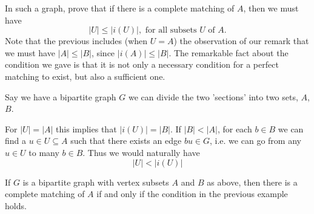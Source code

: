 \documentclass[10pt, a4paper]{article}
\begin{document}
\begin{example}
    In such a graph,
    prove that if there is a complete matching of $A$,
    then we must have
    \[
    |U| \leq |i(U)|,\text{ for all subsets $U$ of $A$}.
    \]
    Note that the previous includes
    (when $U = A$)
    the observation of our remark that we must have $|A| \leq |B|$,
    since $|i(A)| \leq |B|$.
    The remarkable fact about the condition we gave is that it is not only a necessary condition for a perfect matching to exist,
    but also a sufficient one.

    \begin{solution}
        Say we have a bipartite graph $G$ we can divide the two 'sections' into two sets,
        $A$,
        $B$.

        For $|U| = |A|$ this implies that $|i(U)| = |B|$.
        If $|B| < |A|$,
        for each $b \in B$ we can find a $u \in U \subseteq A$ such that there exists an edge $bu \in G$,
        i.e.
        we can go from any $u \in U$ to many $b \in B$.
        Thus we would naturally have
        \[
        |U| < |i(U)|
        \]
    \end{solution}
\end{example}

\begin{theorem}
    If $G$ is a bipartite graph with vertex subsets $A$ and $B$ as above,
    then there is a complete matching of $A$ if and only if the condition in the previous example holds.
\end{theorem}
\end{document}
